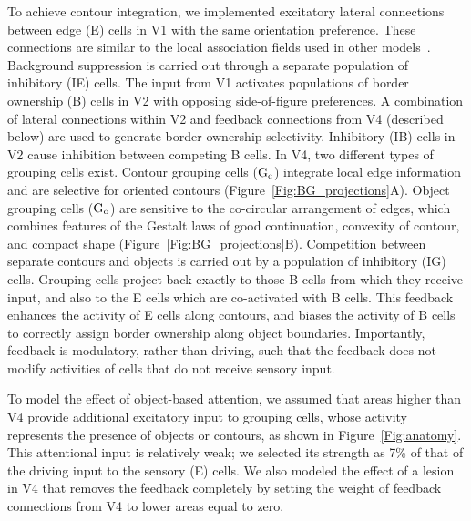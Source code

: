 To achieve contour integration, we implemented excitatory lateral connections between edge (E) cells in V1 with the same orientation preference. These connections are similar to the local association fields used in other models~\citep{Li98,Piech_etal13}. Background suppression is carried out through a separate population of inhibitory (IE) cells. The input from V1 activates populations of border ownership (B) cells in V2 with opposing side-of-figure preferences. A combination of lateral connections within V2 and feedback connections from V4 (described below) are used to generate border ownership selectivity. Inhibitory (IB) cells in V2 cause inhibition between competing B cells. In V4, two different types of grouping cells exist. Contour grouping cells ($\rm G_c$) integrate local edge information and are selective for oriented contours (Figure~\ref{Fig:BG_projections}A). Object grouping cells ($\rm G_o$) are sensitive to the co-circular arrangement of edges, which combines features of the Gestalt laws of good continuation, convexity of contour, and compact shape (Figure~\ref{Fig:BG_projections}B). Competition between separate contours and objects is carried out by a population of inhibitory (IG) cells. Grouping cells project back exactly to those B cells from which they receive input, and also to the E cells which are co-activated with B cells. This feedback enhances the activity of E cells along contours, and biases the activity of B cells to correctly assign border ownership along object boundaries. Importantly, feedback is modulatory, rather than driving, such that the feedback does not modify activities of cells that do not receive sensory input.

To model the effect of  object-based attention, we assumed that areas higher than V4 provide additional excitatory input to grouping cells, whose activity represents the presence of objects or contours, as shown in Figure~\ref{Fig:anatomy}. This attentional input is relatively weak; we selected its strength as 7\% of that of the driving input to the sensory (E) cells. We also modeled the effect of a lesion in V4 that removes the feedback completely by setting the weight of feedback connections from V4 to lower areas equal to zero.

